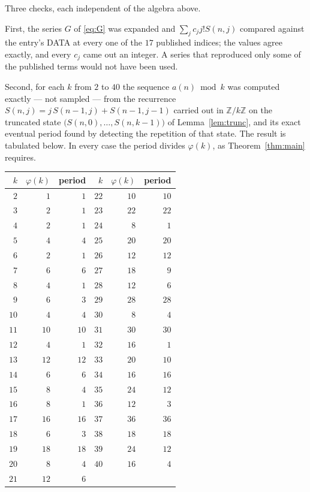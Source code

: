 \documentclass[11pt,a4paper]{article}
\theoremstyle{plain}
\theoremstyle{definition}
\begin{document}
Three checks, each independent of the algebra above.

First, the series $G$ of \eqref{eq:G} was expanded and $\sum_j c_j j! S(n,j)$ compared
against the entry's DATA at every one of the $17$ published indices; the values
agree exactly, and every $c_j$ came out an integer. A series that reproduced only some of
the published terms would not have been used.

Second, for each $k$ from $2$ to $40$ the sequence $a(n)\bmod k$ was computed exactly
--- not sampled --- from the recurrence $S(n,j)=j\,S(n-1,j)+S(n-1,j-1)$ carried out in
$\mathbb{Z}/k\mathbb{Z}$ on the truncated state
$\bigl(S(n,0),\dots,S(n,k-1)\bigr)$ of Lemma~\ref{lem:trunc}, and its exact eventual
period found by detecting the repetition of that state. The result is tabulated below.
In every case the period divides $\varphi(k)$, as Theorem~\ref{thm:main} requires.

\begin{center}\small
\begin{tabular}{rrr@{\qquad\qquad}rrr}
$k$ & $\varphi(k)$ & period & $k$ & $\varphi(k)$ & period \\ \hline
$2$ & $1$ & $1$ & $22$ & $10$ & $10$ \\
$3$ & $2$ & $1$ & $23$ & $22$ & $22$ \\
$4$ & $2$ & $1$ & $24$ & $8$ & $1$ \\
$5$ & $4$ & $4$ & $25$ & $20$ & $20$ \\
$6$ & $2$ & $1$ & $26$ & $12$ & $12$ \\
$7$ & $6$ & $6$ & $27$ & $18$ & $9$ \\
$8$ & $4$ & $1$ & $28$ & $12$ & $6$ \\
$9$ & $6$ & $3$ & $29$ & $28$ & $28$ \\
$10$ & $4$ & $4$ & $30$ & $8$ & $4$ \\
$11$ & $10$ & $10$ & $31$ & $30$ & $30$ \\
$12$ & $4$ & $1$ & $32$ & $16$ & $1$ \\
$13$ & $12$ & $12$ & $33$ & $20$ & $10$ \\
$14$ & $6$ & $6$ & $34$ & $16$ & $16$ \\
$15$ & $8$ & $4$ & $35$ & $24$ & $12$ \\
$16$ & $8$ & $1$ & $36$ & $12$ & $3$ \\
$17$ & $16$ & $16$ & $37$ & $36$ & $36$ \\
$18$ & $6$ & $3$ & $38$ & $18$ & $18$ \\
$19$ & $18$ & $18$ & $39$ & $24$ & $12$ \\
$20$ & $8$ & $4$ & $40$ & $16$ & $4$ \\
$21$ & $12$ & $6$ &  & & \\
\end{tabular}
\end{center}
\end{document}
